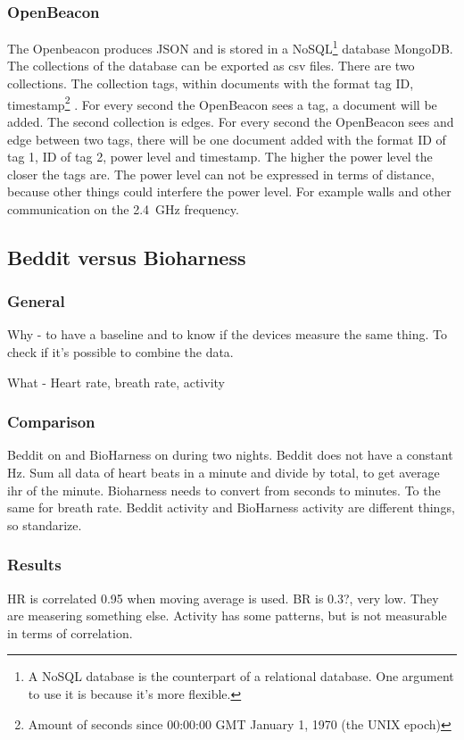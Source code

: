 		\subsubsection{OpenBeacon}
			The Openbeacon produces JSON and is stored in a NoSQL\footnote{A NoSQL database is the counterpart of a relational database. One argument to use it is because it's more flexible.} database MongoDB. The collections of the database can be exported as csv files.
			There are two collections. The collection tags, within documents with the format tag ID, timestamp\footnote{Amount of seconds since 00:00:00 GMT January 1, 1970 (the UNIX epoch)} . For every second the OpenBeacon sees a tag, a document will be added.
			The second collection is edges. For every second the OpenBeacon sees and edge between two tags, there will be one document added with the format ID of tag 1, ID of tag 2, power level and timestamp.
			The higher the power level the closer the tags are. The power level can not be expressed in terms of distance, because other things could interfere the power level. For example walls and other communication on the \SI{2.4}{\giga\hertz} frequency.
	\subsection{Beddit versus Bioharness}
		\subsubsection{General}
			Why - to have a baseline and to know if the devices measure the same thing. To check if it's possible to combine the data.

			What - Heart rate, breath rate, activity
		\subsubsection{Comparison}
			Beddit on and BioHarness on during two nights.
			Beddit does not have a constant Hz. Sum all data of heart beats in a minute and divide by total, to get average ihr of the minute. 
			Bioharness needs to convert from seconds to minutes. To the same for breath rate. 
			Beddit activity and BioHarness activity are different things, so standarize.

		\subsubsection{Results}
			HR is correlated 0.95 when moving average is used.
			BR is 0.3?, very low. They are measering something else.
			Activity has some patterns, but is not measurable in terms of correlation.



